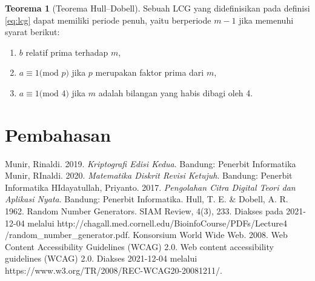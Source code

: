 \documentclass[10pt,conference]{IEEEtran}
\theoremstyle{definition}
\newtheorem{theorem}{Teorema}[section]
\begin{document}
\begin{theorem}[Teorema Hull–Dobell]
    Sebuah LCG yang didefinisikan pada definisi \ref{eq:lcg} dapat memiliki periode penuh, yaitu berperiode $m-1$ jika memenuhi syarat berikut:
    \begin{enumerate}
        \item $b$ relatif prima terhadap $m$,
        \item $a \equiv 1 \text{(mod }p\text{)}$ jika $p$ merupakan faktor prima dari $m$,
        \item $a \equiv 1 \text{(mod }4\text{)}$ jika $m$ adalah bilangan yang habis dibagi oleh 4.
    \end{enumerate}
\end{theorem}

\section{Pembahasan}

\begin{thebibliography}{00}
 Munir, Rinaldi. 2019. \emph{Kriptografi Edisi Kedua}. Bandung: Penerbit Informatika 
 Munir, RInaldi. 2020. \emph{Matematika Diskrit Revisi Ketujuh}. Bandung: Penerbit Informatika
 HIdayatullah, Priyanto. 2017. \emph{Pengolahan Citra Digital Teori dan Aplikasi Nyata}. Bandung: Penerbit Informatika.
 Hull, T. E. \& Dobell, A. R. 1962. Random Number Generators. SIAM Review, 4(3), 233. Diakses pada 2021-12-04 melalui http://chagall.med.cornell.edu/BioinfoCourse/PDFs/Lecture4\\
/random\_number\_generator.pdf.
 Konsorsium World Wide Web. 2008. Web Content Accessibility Guidelines (WCAG) 2.0. Web content accessibility guidelines (WCAG) 2.0. Diakses 2021-12-04 melalui https://www.w3.org/TR/2008/REC-WCAG20-20081211/. 
\end{thebibliography}
\end{document}
